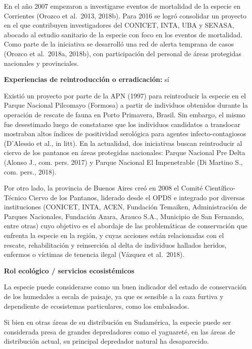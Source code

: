 \documentclass[
  x11names]{article}
\begin{document}
En el año 2007 empezaron a investigarse eventos de mortalidad de la
especie en Corrientes (Orozco et al.~2013, 2018b). Para 2016 se logró
consolidar un proyecto en el que contribuyen investigadores del CONICET,
INTA, UBA y SENASA, abocado al estudio sanitario de la especie con foco
en los eventos de mortalidad. Como parte de la iniciativa se desarrolló
una red de alerta temprana de casos (Orozco et al.~2018a, 2018b), con
participación del personal de áreas protegidas nacionales y
provinciales.

\textbf{Experiencias de reintroducción o erradicación:} sí

Existió un proyecto por parte de la APN (1997) para reintroducir la
especie en el Parque Nacional Pilcomayo (Formosa) a partir de individuos
obtenidos durante la operación de rescate de fauna en Porto Primavera,
Brasil. Sin embargo, el mismo fue desestimado luego de constatarse que
los individuos candidatos a translocar mostraban altos índices de
positividad serológica para agentes infecto-contagiosos (D'Alessio et
al., in litt). En la actualidad, dos iniciativas buscan reintroducir al
ciervo de los pantanos en áreas protegidas nacionales: Parque Nacional
Pre Delta (Alonso J., com. pers. 2017) y Parque Nacional El Impenetrable
(Di Martino S., com. pers., 2018).

Por otro lado, la provincia de Buenos Aires creó en 2008 el Comité
Científico-Técnico Ciervo de los Pantanos, liderado desde el OPDS e
integrado por diversas instituciones (CONICET, INTA, ACEN, Fundación
Temaiken, Administración de Parques Nacionales, Fundación Azara, Arauco
S.A., Municipio de San Fernando, entre otras) cuyo objetivo es el
abordaje de las problemáticas de conservación que enfrenta la especie en
la región, y cuyas acciones están relacionadas con el~ rescate,
rehabilitación y reinserción al delta de individuos hallados heridos,
enfermos o víctimas de tenencia ilegal (Vázquez et al.~2018).

\textbf{Rol ecológico / servicios ecosistémicos}

La especie puede considerarse como un buen indicador del estado de
conservación de los humedales a escala de paisaje, ya que es sensible a
la caza furtiva y dependiente de ecosistemas particulares, como los
embalsados.

Si bien en otras áreas de su distribución en Sudamérica, la especie
puede ser considerada presa de grandes depredadores como el yaguareté,
en las áreas de distribución actual, su principal depredador natural ha
desaparecido.
\end{document}
